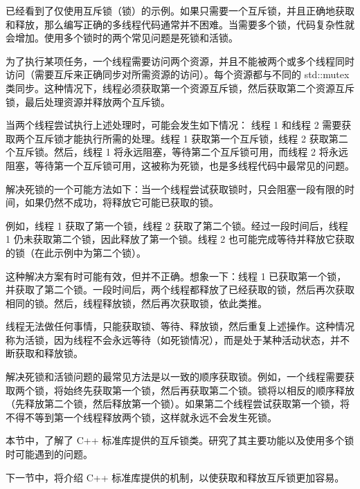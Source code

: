 
已经看到了仅使用互斥锁（锁）的示例。如果只需要一个互斥锁，并且正确地获取和释放，那么编写正确的多线程代码通常并不困难。当需要多个锁，代码复杂性就会增加。使用多个锁时的两个常见问题是死锁和活锁。


为了执行某项任务，一个线程需要访问两个资源，并且不能被两个或多个线程同时访问（需要互斥来正确同步对所需资源的访问）。每个资源都与不同的 std::mutex 类同步。这种情况下，线程必须获取第一个资源互斥锁，然后获取第二个资源互斥锁，最后处理资源并释放两个互斥锁。

当两个线程尝试执行上述处理时，可能会发生如下情况： 线程 1 和线程 2 需要获取两个互斥锁才能执行所需的处理。线程 1 获取第一个互斥锁，线程 2 获取第二个互斥锁。然后，线程 1 将永远阻塞，等待第二个互斥锁可用，而线程 2 将永远阻塞，等待第一个互斥锁可用，这被称为死锁，也是多线程代码中最常见的问题。


解决死锁的一个可能方法如下：当一个线程尝试获取锁时，只会阻塞一段有限的时间，如果仍然不成功，将释放它可能已获取的锁。

例如，线程 1 获取了第一个锁，线程 2 获取了第二个锁。经过一段时间后，线程 1 仍未获取第二个锁，因此释放了第一个锁。线程 2 也可能完成等待并释放它获取的锁（在此示例中为第二个锁）。

这种解决方案有时可能有效，但并不正确。想象一下：线程 1 已获取第一个锁，并获取了第二个锁。一段时间后，两个线程都释放了已经获取的锁，然后再次获取相同的锁。然后，线程释放锁，然后再次获取锁，依此类推。

线程无法做任何事情，只能获取锁、等待、释放锁，然后重复上述操作。这种情况称为活锁，因为线程不会永远等待（如死锁情况），而是处于某种活动状态，并不断获取和释放锁。

解决死锁和活锁问题的最常见方法是以一致的顺序获取锁。例如，一个线程需要获取两个锁，将始终先获取第一个锁，然后再获取第二个锁。锁将以相反的顺序释放（先释放第二个锁，然后释放第一个锁）。如果第二个线程尝试获取第一个锁，将不得不等到第一个线程释放两个锁，这样就永远不会发生死锁。

本节中，了解了 C++ 标准库提供的互斥锁类。研究了其主要功能以及使用多个锁时可能遇到的问题。

下一节中，将介绍 C++ 标准库提供的机制，以使获取和释放互斥锁更加容易。





























